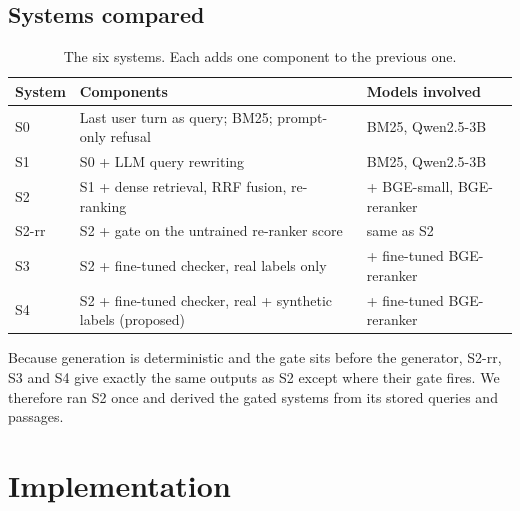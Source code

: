\documentclass[11pt,a4paper]{report}
\newcommand{\sys}[1]{\textsf{#1}}
\begin{document}
\section{Systems compared}
\begin{table}[H]
\centering\small
\begin{tabularx}{\textwidth}{@{}lYl@{}}
\toprule
System & Components & Models involved \\
\midrule
\sys{S0} & Last user turn as query; BM25; prompt-only refusal & BM25, Qwen2.5-3B \\
\sys{S1} & \sys{S0} + LLM query rewriting & BM25, Qwen2.5-3B \\
\sys{S2} & \sys{S1} + dense retrieval, RRF fusion, re-ranking & + BGE-small, BGE-reranker \\
\sys{S2-rr} & \sys{S2} + gate on the untrained re-ranker score & same as \sys{S2} \\
\sys{S3} & \sys{S2} + fine-tuned checker, real labels only & + fine-tuned BGE-reranker \\
\sys{S4} & \sys{S2} + fine-tuned checker, real + synthetic labels (proposed) & + fine-tuned BGE-reranker \\
\bottomrule
\end{tabularx}
\caption{The six systems. Each adds one component to the previous one.}
\label{tab:systems}
\end{table}
Because generation is deterministic and the gate sits before the generator, \sys{S2-rr}, \sys{S3} and \sys{S4} give exactly the same outputs as \sys{S2} except where their gate fires. We therefore ran \sys{S2} once and derived the gated systems from its stored queries and passages.

\chapter{Implementation}
\end{document}
